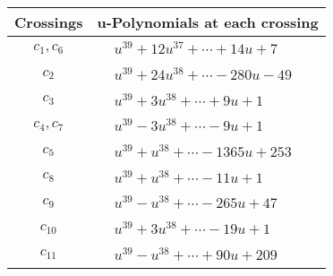 \documentclass[1p]{elsarticle_modified}
\theoremstyle{definition}
\begin{document}
\begin{tabular}{m{50pt}|m{274pt}}
Crossings & \hspace{64pt}u-Polynomials at each crossing \\
\hline $$\begin{aligned}c_{1},c_{6}\end{aligned}$$&$\begin{aligned}
&u^{39}+12 u^{37}+\cdots+14 u+7
\end{aligned}$\\
\hline $$\begin{aligned}c_{2}\end{aligned}$$&$\begin{aligned}
&u^{39}+24 u^{38}+\cdots-280 u-49
\end{aligned}$\\
\hline $$\begin{aligned}c_{3}\end{aligned}$$&$\begin{aligned}
&u^{39}+3 u^{38}+\cdots+9 u+1
\end{aligned}$\\
\hline $$\begin{aligned}c_{4},c_{7}\end{aligned}$$&$\begin{aligned}
&u^{39}-3 u^{38}+\cdots-9 u+1
\end{aligned}$\\
\hline $$\begin{aligned}c_{5}\end{aligned}$$&$\begin{aligned}
&u^{39}+u^{38}+\cdots-1365 u+253
\end{aligned}$\\
\hline $$\begin{aligned}c_{8}\end{aligned}$$&$\begin{aligned}
&u^{39}+u^{38}+\cdots-11 u+1
\end{aligned}$\\
\hline $$\begin{aligned}c_{9}\end{aligned}$$&$\begin{aligned}
&u^{39}- u^{38}+\cdots-265 u+47
\end{aligned}$\\
\hline $$\begin{aligned}c_{10}\end{aligned}$$&$\begin{aligned}
&u^{39}+3 u^{38}+\cdots-19 u+1
\end{aligned}$\\
\hline $$\begin{aligned}c_{11}\end{aligned}$$&$\begin{aligned}
&u^{39}- u^{38}+\cdots+90 u+209
\end{aligned}$\\
\hline
\end{tabular}\\~\\
\end{document}
